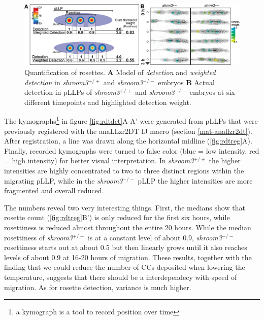 \documentclass[10pt, b5paper, singlespacinge, twoside]{reedthesis} %
\theoremstyle{definition}
\theoremstyle{definition}
\theoremstyle{definition}
\theoremstyle{remark}
\begin{document}
\begin{figure}[H]

{\centering \includegraphics[width=0.95\linewidth,]{figures/results/03_rosettes/detection_model} 

}

\caption[Quantification of rosettes]{Quantification of rosettes. \textbf{A} Model of \emph{detection} and \emph{weighted detection} in \emph{shroom3}\(^{+/+}\) and \emph{shroom3}\(^{-/-}\) embryos \textbf{B} Actual detection in pLLPs of \emph{shroom3}\(^{+/+}\) and \emph{shroom3}\(^{-/-}\) embryos at six different timepoints and highlighted detection weight.}\label{fig:rdtdetmdl}
\end{figure}
The kymographs\footnote{a kymograph is a tool to record position over time} in figure \ref{fig:rdtdet}A-A' were generated from pLLPs that were previously registered with the anaLLzr2DT IJ macro (section \ref{mat-anallzr2dt}). After registration, a line was drawn along the horizontal midline (\ref{fig:rdtreg}A). Finally, recorded kymographs were turned to false color (blue = low intensity, red = high intensity) for better visual interpretation. In \emph{shroom3}\(^{+/+}\) the higher intensities are highly concentrated to two to three distinct regions within the migrating pLLP, while in the \emph{shroom3}\(^{-/-}\) pLLP the higher intensities are more fragmented and overall reduced.

The numbers reveal two very interesting things. First, the medians show that rosette count (\ref{fig:rdtreg}B') is only reduced for the first six hours, while rosettiness is reduced almost throughout the entire 20 hours. While the median rosettiness of \emph{shroom3}\(^{+/+}\) is at a constant level of about 0.9, \emph{shroom3}\(^{-/-}\) rosettiness starts out at about 0.5 but then linearly grows until it also reaches levels of about 0.9 at 16-20 hours of migration. These results, together with the finding that we could reduce the number of CCs deposited when lowering the temperature, suggests that there should be a interdependecy with speed of migration. As for rosette detection, variance is much higher.
\end{document}
